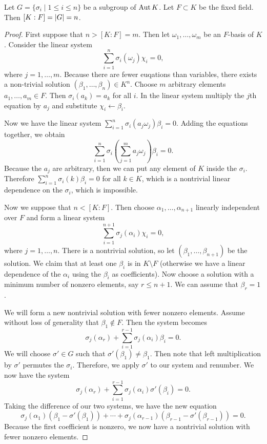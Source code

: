 \message{ !name(notes.tex)}\documentclass[10pt, twoside]{article}
\begin{document}
    \begin{thm}
        Let $G = \{\sigma_i \mid 1 \leq i \leq n\}$ be a subgroup of $\operatorname{Aut}{K}$. Let $F \subset K$ be the fixed field. Then $[K:F] = \lvert G\rvert = n$.
        \begin{proof}
            First suppose that $n > [K:F] = m$. Then let $\omega_1, \ldots, \omega_m$ be an $F$-basis of $K$. Consider the linear system \[\sum_{i=1}^n \sigma_i(\omega_j) \chi_i = 0,\] where $j = 1, \ldots, m$. Because there are fewer euqations than variables, there exists a non-trivial solution $(\beta_1, \ldots, \beta_n) \in K^n$. Choose $m$ arbitrary elements $a_1, \ldots, a_m \in F$. Then $\sigma_i(a_k) = a_k$ for all $i$. In the linear system multiply the $j$th equation by $a_j$ and substitute $\chi_i \gets \beta_i$.

            Now we have the linear system $\sum_{i=1}^n \sigma_i(a_j \omega_j) \beta_i = 0$. Adding the equations together, we obtain \[\sum_{i=1}^n \sigma_i \left(\sum_{j=1}^m a_j \omega_j \right) \beta_i = 0.\] Because the $a_j$ are arbitrary, then we can put any element of $K$ inside the $\sigma_i$. Therefore $\sum_{i=1}^n \sigma_i(k) \beta_i = 0$ for all $k \in K$, which is a nontrivial linear dependence on the $\sigma_i$, which is impossible.

            Now we suppose that $n < [K:F]$. Then choose $\alpha_1, \ldots, \alpha_{n+1}$ linearly independent over $F$ and form a linear system \[\sum_{i=1}^{n+1} \sigma_j(\alpha_i) \chi_i = 0,\] where $j = 1, \ldots, n$. There is a nontrivial solution, so let $(\beta_1, \ldots, \beta_{n+1})$ be the solution. We claim that at least one $\beta_i$ is in $K\setminus F$ (otherwise we have a linear dependence of the $\alpha_i$ using the $\beta_i$ as coefficients).  Now choose a solution with a minimum number of nonzero elements, say $r \leq n+1$. We can assume that $\beta_r = 1$.

            We will form a new nontrivial solution with fewer nonzero elements. Assume without loss of generality that $\beta_1 \not\in F$. Then the system becomes \[\sigma_j(\alpha_r) + \sum_{i=1}^{r-1} \sigma_j(\alpha_i) \beta_i = 0.\] We will choose $\sigma' \in G$ such that $\sigma'(\beta_1) \neq \beta_1$. Then note that left multiplication by $\sigma'$ permutes the $\sigma_i$. Therefore, we apply $\sigma'$ to our system and renumber. We now have the system \[\sigma_j(\alpha_r) + \sum_{i=1}^{r-1} \sigma_j(\alpha_i) \sigma'(\beta_i) = 0.\] Taking the difference of our two systems, we have the new equation \[\sigma_j(\alpha_1)(\beta_1 - \sigma'(\beta_1)) + \cdots + \sigma_j(\alpha_{r-1})(\beta_{r-1} - \sigma'(\beta_{r-1})) = 0.\] Because the first coefficient is nonzero, we now have a nontrivial solution with fewer nonzero elements.
        \end{proof}
    \end{thm}
\end{document}
